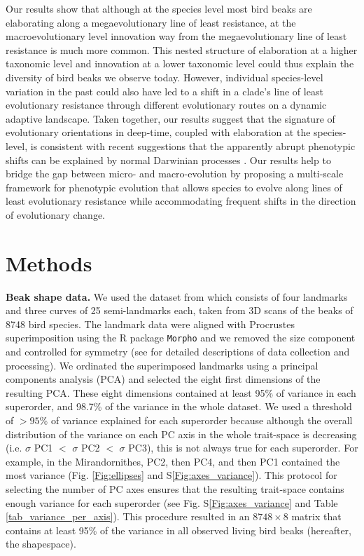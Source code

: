 \documentclass[12pt,letterpaper]{article}
\begin{document}
Our results show that although at the species level most bird beaks are elaborating along a megaevolutionary line of least resistance, at the macroevolutionary level innovation way from the megaevolutionary line of least resistance is much more common.
This nested structure of elaboration at a higher taxonomic level and innovation at a lower taxonomic level could thus explain the diversity of bird beaks we observe today.
However, individual species-level variation in the past could also have led to a shift in a clade's line of least evolutionary resistance through different evolutionary routes on a dynamic adaptive landscape. Taken together, our results suggest that the signature of evolutionary orientations in deep-time, coupled with elaboration at the species-level, is consistent with recent suggestions that the apparently abrupt phenotypic shifts can be explained by normal Darwinian processes \cite{pagel2022general}.
Our results help to bridge the gap between micro- and macro-evolution by proposing a multi-scale framework for  phenotypic evolution that allows species to evolve along lines of least evolutionary resistance while accommodating frequent shifts in the direction of evolutionary change.

\section{Methods}


\textbf{Beak shape data.}
We used the dataset from \cite{cooney2017mega,chira2020signature,hughes2022global} which consists of four landmarks and three curves of 25 semi-landmarks each, taken from 3D scans of  the beaks of 8748 bird species.
The landmark data were aligned with Procrustes superimposition using the R package \texttt{Morpho} \cite{Rcore,Morpho} and we removed the size component and controlled for symmetry (see \cite{cooney2017mega,chira2020signature,hughes2022global} for detailed descriptions of data collection and processing).
We ordinated the superimposed landmarks using a principal components analysis (PCA) and selected the eight first dimensions of the resulting PCA.
These eight dimensions contained at least 95\% of variance in each superorder, and 98.7\% of the variance in the whole dataset.
We used a threshold of $>95$\% of variance explained for each superorder because although the overall distribution of the variance on each PC axis in the whole trait-space is decreasing (i.e.
$\sigma$ PC1 $<$ $\sigma$ PC2 $<$ $\sigma$ PC3), this is not always true for each superorder.
For example, in the Mirandornithes, PC2, then PC4, and then PC1 contained the most variance (Fig. \ref{Fig:ellipses} and S\ref{Fig:axes_variance}).
This protocol for selecting the number of PC axes ensures that the resulting trait-space contains enough variance for each superorder (see Fig. S\ref{Fig:axes_variance} and Table \ref{tab_variance_per_axis}).
This procedure resulted in an $8748 \times 8$ matrix that contains at least 95\% of the variance in all observed living bird beaks (hereafter, the shapespace).
\end{document}
